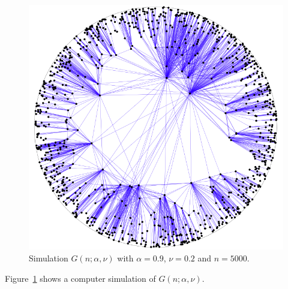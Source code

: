\begin{figure}[!t]
\centering
\includegraphics[scale=0.3]{figures/KPKVB.png}
\caption{Simulation $G(n;\alpha, \nu)$ with $\alpha = 0.9$, $\nu = 0.2$ and $n = 5000$.
}
\label{fig:H_graph_example}
\end{figure}

\noindent
Figure~\ref{fig:H_graph_example} shows a computer simulation of $G(n;\alpha, \nu)$.


